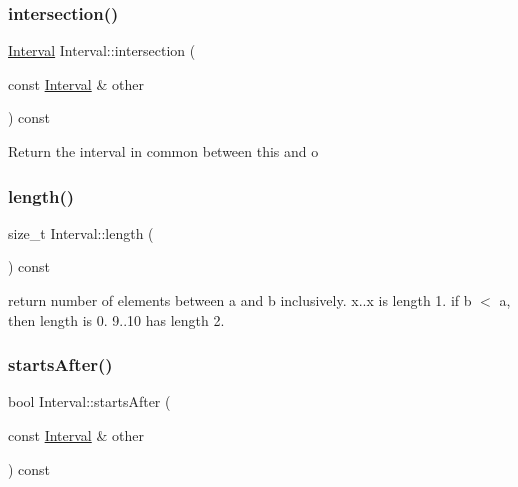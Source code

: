 \subsubsection{\texorpdfstring{intersection()}{intersection()}}
{\footnotesize\ttfamily \hyperlink{classantlr4_1_1misc_1_1Interval}{Interval} Interval\+::intersection (\begin{DoxyParamCaption}\item[{const \hyperlink{classantlr4_1_1misc_1_1Interval}{Interval} \&}]{other }\end{DoxyParamCaption}) const}



Return the interval in common between this and o 

\mbox{\label{classantlr4_1_1misc_1_1Interval_a05e2505cce0c79858b76ad20914c7674}} 
\subsubsection{\texorpdfstring{length()}{length()}}
{\footnotesize\ttfamily size\+\_\+t Interval\+::length (\begin{DoxyParamCaption}{ }\end{DoxyParamCaption}) const}

return number of elements between a and b inclusively. x..x is length 1. if b $<$ a, then length is 0. 9..10 has length 2. \mbox{\label{classantlr4_1_1misc_1_1Interval_ab42e396d0e2f9ead8ea9125a069a2d88}} 
\subsubsection{\texorpdfstring{starts\+After()}{startsAfter()}}
{\footnotesize\ttfamily bool Interval\+::starts\+After (\begin{DoxyParamCaption}\item[{const \hyperlink{classantlr4_1_1misc_1_1Interval}{Interval} \&}]{other }\end{DoxyParamCaption}) const}




